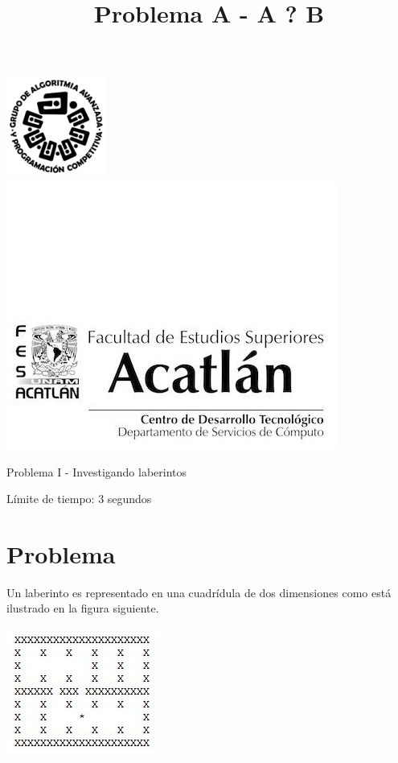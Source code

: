 \documentclass[letter,10pt]{article}
\date{}
\begin{document}
\title{Problema A - A ? B}

\includegraphics[scale=0.6]{logo} \hspace*{9.00cm}
\includegraphics[scale=0.5]{dsc} 
\bigskip
\begin{center}
    \Large Problema I - Investigando laberintos
\end{center}

\begin{flushright}
Límite de tiempo: 3 segundos
\par\end{flushright}
\bigskip

\section*{Problema}

Un laberinto es representado en una cuadrídula de dos dimensiones como está ilustrado en la figura siguiente. 

\begin{center}
    \includegraphics{1.jpg}
\end{center}
\end{document}
